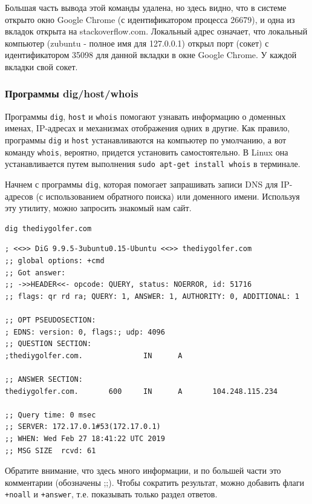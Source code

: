 \documentclass[12pt]{article}
\begin{document}
Большая часть вывода этой команды удалена, но здесь видно, что в системе
открыто окно Google Chrome (с идентификатором процесса 26679), и одна из
вкладок открыта на stackoverflow.com. Локальный адрес означает, что
локальный компьютер (zubuntu - полное имя для 127.0.0.1) открыл порт
(сокет) с идентификатором 35098 для данной вкладки в окне Google Chrome.
У каждой вкладки свой сокет.

\hypertarget{dig-host-whois}{%
\subsubsection{\texorpdfstring{\protect\hyperlink{dig-host-whois}{}Программы
dig/host/whois}{Программы dig/host/whois}}\label{dig-host-whois}}

Программы \texttt{dig}, \texttt{host} и \texttt{whois} помогают узнавать
информацию о доменных именах, IP-адресах и механизмах отображения одних
в другие. Как правило, программы \texttt{dig} и \texttt{host}
устанавливаются на компьютер по умолчанию, а вот команду \texttt{whois},
вероятно, придется установить самостоятельно. В Linux она
устанавливается путем выполнения \texttt{sudo\ apt-get\ install\ whois}
в терминале.

Начнем с программы \texttt{dig}, которая помогает запрашивать записи DNS
для IP-адресов (с использованием обратного поиска) или доменного имени.
Используя эту утилиту, можно запросить знакомый нам сайт.

\begin{verbatim}
dig thediygolfer.com
\end{verbatim}

\begin{verbatim}
; <<>> DiG 9.9.5-3ubuntu0.15-Ubuntu <<>> thediygolfer.com
;; global options: +cmd
;; Got answer:
;; ->>HEADER<<- opcode: QUERY, status: NOERROR, id: 51716
;; flags: qr rd ra; QUERY: 1, ANSWER: 1, AUTHORITY: 0, ADDITIONAL: 1

;; OPT PSEUDOSECTION:
; EDNS: version: 0, flags:; udp: 4096
;; QUESTION SECTION:
;thediygolfer.com.              IN      A

;; ANSWER SECTION:
thediygolfer.com.       600     IN      A       104.248.115.234

;; Query time: 0 msec
;; SERVER: 172.17.0.1#53(172.17.0.1)
;; WHEN: Wed Feb 27 18:41:22 UTC 2019
;; MSG SIZE  rcvd: 61
\end{verbatim}

Обратите внимание, что здесь много информации, и по большей части это
комментарии (обозначены ;;). Чтобы сократить результат, можно добавить
флаги \texttt{+noall} и \texttt{+answer}, т.е. показывать только раздел
ответов.
\end{document}

